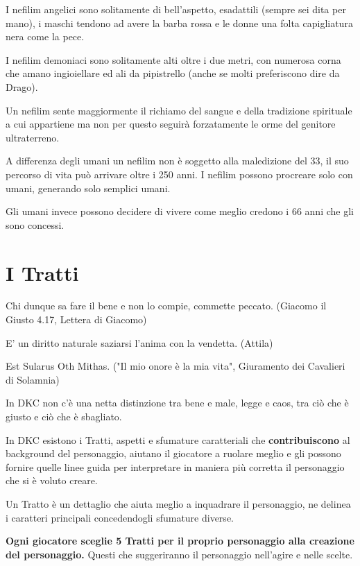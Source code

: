 \documentclass[a4paper,twoside,openany]{book}
\begin{document}
\begin{multicols}{2}
I nefilim angelici sono solitamente di bell'aspetto, esadattili (sempre sei dita per mano), i maschi tendono ad avere la barba rossa e le donne una folta capigliatura nera come la pece.

I nefilim demoniaci sono solitamente alti oltre i due metri, con numerosa corna che amano ingioiellare ed ali da pipistrello (anche se molti preferiscono dire da Drago).

Un nefilim sente maggiormente il richiamo del sangue e della tradizione spirituale a cui appartiene ma non per questo seguirà forzatamente le orme del genitore ultraterreno.

A differenza degli umani un nefilim non è soggetto alla maledizione del 33, il suo percorso di vita può arrivare oltre i 250 anni. I nefilim possono procreare solo con umani, generando solo semplici umani.

Gli umani invece possono decidere di vivere come meglio credono i 66 anni che gli sono concessi.


\section{I Tratti}\hypertarget{tratti}{}\label{tratti}

\begin{enfasi}{Chi dunque sa fare il bene e non lo compie, commette peccato. (Giacomo il Giusto 4.17, Lettera di Giacomo)
		\smallskip

		E' un diritto naturale saziarsi l'anima con la vendetta. (Attila)
		\smallskip

		Est Sularus Oth Mithas. ("Il mio onore è la mia vita", Giuramento dei Cavalieri di Solamnia)
}\end{enfasi}


	In DKC non c'è una netta distinzione tra bene e male, legge e caos, tra ciò che è giusto e ciò che è sbagliato.

	In DKC esistono i Tratti, aspetti e sfumature caratteriali che \textbf{contribuiscono} al background del personaggio, aiutano il giocatore a ruolare meglio e gli possono fornire quelle linee guida per interpretare in maniera più corretta il personaggio che si è voluto creare.

	Un Tratto è un dettaglio che aiuta meglio a inquadrare il personaggio, ne delinea i caratteri principali concedendogli sfumature diverse.

	\textbf{Ogni giocatore sceglie 5 Tratti per il proprio personaggio alla creazione del personaggio.} Questi che suggeriranno il personaggio nell'agire e nelle scelte.


\end{multicols}
\end{document}
